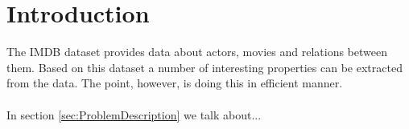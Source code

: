 \label{Introduction}
\section{Introduction}

The IMDB dataset provides data about actors, movies and relations between them. Based on this dataset a number of interesting properties can be extracted from the data. The point, however, is doing this in efficient manner.
\\
\\
In section \ref{sec:ProblemDescription} we talk about...